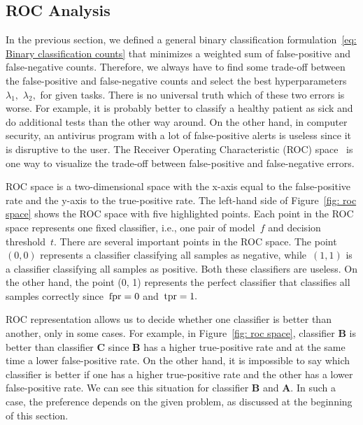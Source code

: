 \subsection{ROC Analysis}\label{subsec: ROC}

In the previous section, we defined a general binary classification formulation~\eqref{eq: Binary classification counts} that minimizes a weighted sum of false-positive and false-negative counts. Therefore, we always have to find some trade-off between the false-positive and false-negative counts and select the best hyperparameters~$\lambda_1,$ $\lambda_2,$ for given tasks. There is no universal truth which of these two errors is worse. For example, it is probably better to classify a healthy patient as sick and do additional tests than the other way around. On the other hand, in computer security, an antivirus program with a lot of false-positive alerts is useless since it is disruptive to the user. The Receiver Operating Characteristic (ROC) space~\cite{egan1975signal, fawcett2006introduction} is one way to visualize the trade-off between false-positive and false-negative errors.

ROC space is a two-dimensional space with the x-axis equal to the false-positive rate and the y-axis to the true-positive rate. The left-hand side of Figure~\ref{fig: roc space} shows the ROC space with five highlighted points. Each point in the ROC space represents one fixed classifier, i.e., one pair of model~$f$ and decision threshold~$t.$ There are several important points in the ROC space. The point~$(0, 0)$ represents a classifier classifying all samples as negative, while~$(1, 1)$ is a classifier classifying all samples as positive. Both these classifiers are useless. On the other hand, the point (0, 1) represents the perfect classifier that classifies all samples correctly since~$\operatorname{fpr} = 0$ and~$\operatorname{tpr} = 1.$

ROC representation allows us to decide whether one classifier is better than another, only in some cases. For example, in Figure~\ref{fig: roc space}, classifier \textbf{B} is better than classifier \textbf{C} since \textbf{B} has a higher true-positive rate and at the same time a lower false-positive rate. On the other hand, it is impossible to say which classifier is better if one has a higher true-positive rate and the other has a lower false-positive rate. We can see this situation for classifier \textbf{B} and \textbf{A}. In such a case, the preference depends on the given problem, as discussed at the beginning of this section.

